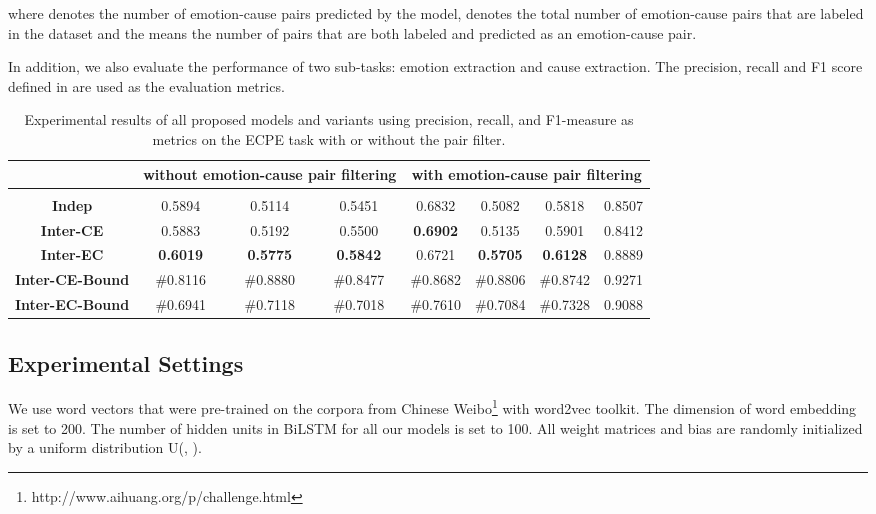 \documentclass[11pt,a4paper]{article}
\begin{document}
where  denotes the number of emotion-cause pairs predicted by the model,  denotes the total number of emotion-cause pairs that are labeled in the dataset and the  means the number of pairs that are both labeled and predicted as an emotion-cause pair.

In addition, we also evaluate the performance of two sub-tasks: emotion extraction and cause extraction. The precision, recall and F1 score defined in \citet{gui2016event} are used as the evaluation metrics. 


\begin{table*}
	\small
	\centering
	
	\begin{tabular} {c|c|c|c|c|c|c|c}
		\hline
		  & \multicolumn{3}{|c|}{without emotion-cause pair filtering} & \multicolumn{4}{|c}{with emotion-cause pair filtering}\\
		\hline
		&  &  &  &  &  &  &  \\
		\hline
		\textbf{Indep} & 0.5894 & 0.5114 & 0.5451 & 0.6832 & 0.5082 & 0.5818 & 0.8507\\
		\textbf{Inter-CE} & 0.5883 & 0.5192 & 0.5500 & \textbf{0.6902} & 0.5135 & 0.5901 & 0.8412\\
		\textbf{Inter-EC} & \textbf{0.6019} & \textbf{0.5775} & \textbf{0.5842} & 0.6721 & \textbf{0.5705} & \textbf{0.6128} & 0.8889\\

		\textbf{Inter-CE-Bound} & \#0.8116 & \#0.8880  & \#0.8477 & \#0.8682 & \#0.8806 & \#0.8742 & 0.9271\\
		\textbf{Inter-EC-Bound} & \#0.6941 & \#0.7118 & \#0.7018 & \#0.7610 & \#0.7084 & \#0.7328 & 0.9088\\
		
		\hline
	\end{tabular}
	\caption{Experimental results of all proposed models and variants using precision, recall, and F1-measure as metrics on the ECPE task with or without the pair filter.}
	\label{TableFour}
\end{table*}

\subsection{Experimental Settings}
We use word vectors that were pre-trained on the corpora from Chinese Weibo\footnote{http://www.aihuang.org/p/challenge.html} with word2vec \cite{mikolov2013distributed} toolkit. The dimension of word embedding is set to 200. The number of hidden units in BiLSTM for all our models is set to 100. All weight matrices and bias are randomly initialized by a uniform distribution U(, ).
\end{document}
